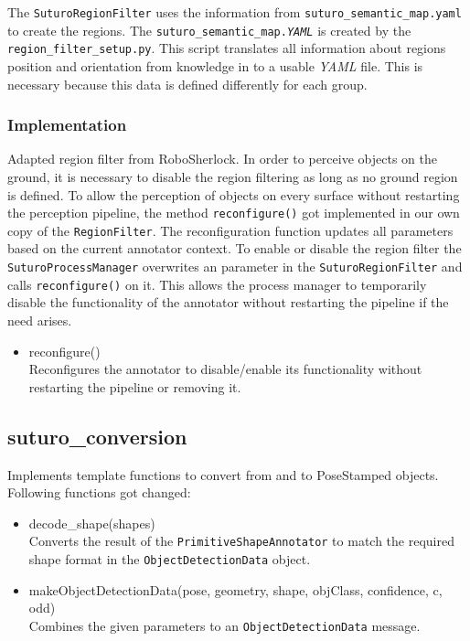 \documentclass[main.tex]{subfiles}
\begin{document}
The \texttt{SuturoRegionFilter} uses the information from \texttt{suturo\_semantic\_map.yaml} to create the regions. 
The \texttt{suturo\_semantic\_map.\textit{YAML}} is created by the \texttt{region\_filter\_setup.py}. 
This script translates all information about regions position and orientation from knowledge in to a usable \textit{YAML} file. 
This is necessary because this data is defined differently for each group.

\subsubsection{Implementation}
Adapted region filter from RoboSherlock. In order to perceive objects on the ground, it is necessary to disable
the region filtering as long as no ground region is defined. To allow the perception of objects on every surface
without restarting the perception pipeline, the method \texttt{reconfigure()} got implemented in our own copy of the 
\texttt{RegionFilter}. The reconfiguration function updates all parameters based on the current annotator context.
To enable or disable the region filter the \texttt{SuturoProcessManager} overwrites an parameter in the \texttt{SuturoRegionFilter}
and calls \texttt{reconfigure()} on it. 
This allows the process manager to temporarily disable the functionality of the annotator without restarting the pipeline if the need arises.

\begin{itemize}
\item reconfigure()\\
Reconfigures the annotator to disable/enable its functionality without restarting the pipeline or removing it.
\end{itemize}

\subsection{suturo\_conversion}
Implements template functions to convert from and to PoseStamped objects.
Following functions got changed:

\begin{itemize}
\item decode\_shape(shapes)\\
Converts the result of the \texttt{PrimitiveShapeAnnotator} to match the required shape format in the \texttt{ObjectDetectionData} object.

\item makeObjectDetectionData(pose, geometry, shape, objClass, confidence, c, odd)\\
Combines the given parameters to an \texttt{ObjectDetectionData} message.
\end{itemize}
\end{document}
